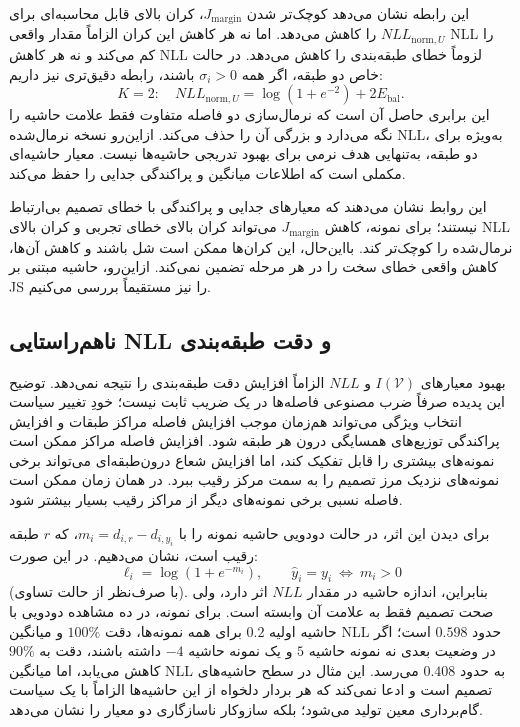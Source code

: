 این رابطه نشان می‌دهد کوچک‌تر شدن $J_{\mathrm{margin}}$، کران بالای قابل محاسبه‌ای برای $NLL_{\mathrm{norm},U}$ را کاهش می‌دهد. اما نه هر کاهش این کران الزاماً مقدار واقعی NLL را کم می‌کند و نه هر کاهش NLL لزوماً خطای طبقه‌بندی را کاهش می‌دهد. در حالت خاص دو طبقه، اگر همه $\sigma_i>0$ باشند، رابطه دقیق‌تری نیز داریم:
\begin{equation}\label{cmp:eq:ch3-normalized-NLL-binary}
\boxed{
K=2:\quad
NLL_{\mathrm{norm},U}
=\log(1+e^{-2})+2E_{\mathrm{bal}}.
}
\end{equation}
این برابری حاصل آن است که نرمال‌سازی دو فاصله متفاوت فقط علامت حاشیه را نگه می‌دارد و بزرگی آن را حذف می‌کند. ازاین‌رو نسخه نرمال‌شده NLL، به‌ویژه برای دو طبقه، به‌تنهایی هدف نرمی برای بهبود تدریجی حاشیه‌ها نیست. معیار حاشیه‌ای مکملی است که اطلاعات میانگین و پراکندگی جدایی را حفظ می‌کند.

این روابط نشان می‌دهند که معیارهای جدایی و پراکندگی
با خطای تصمیم بی‌ارتباط نیستند؛ برای نمونه،
کاهش $J_{\mathrm{margin}}$ می‌تواند کران بالای
خطای تجربی و کران بالای NLL نرمال‌شده را
کوچک‌تر کند. بااین‌حال، این کران‌ها ممکن است
شل باشند و کاهش آن‌ها، کاهش واقعی خطای سخت را
در هر مرحله تضمین نمی‌کند. ازاین‌رو،
حاشیه مبتنی بر JS را نیز مستقیماً بررسی می‌کنیم.



\subsection{ناهم‌راستایی NLL و دقت طبقه‌بندی}

بهبود معیارهای $I(\mathcal V)$ و $NLL$ الزاماً افزایش دقت طبقه‌بندی را نتیجه نمی‌دهد. توضیح این پدیده صرفاً ضرب مصنوعی فاصله‌ها در یک ضریب ثابت نیست؛ خودِ تغییر سیاست انتخاب ویژگی می‌تواند هم‌زمان موجب افزایش فاصله مراکز طبقات و افزایش پراکندگی توزیع‌های همسایگی درون هر طبقه شود. افزایش فاصله مراکز ممکن است نمونه‌های بیشتری را قابل تفکیک کند، اما افزایش شعاع درون‌طبقه‌ای می‌تواند برخی نمونه‌های نزدیک مرز تصمیم را به سمت مرکز رقیب ببرد. در همان زمان ممکن است فاصله نسبی برخی نمونه‌های دیگر از مراکز رقیب بسیار بیشتر شود.

برای دیدن این اثر، در حالت دودویی حاشیه نمونه را با $m_i=d_{i,r}-d_{i,y_i}$، که $r$ طبقه رقیب است، نشان می‌دهیم. در این صورت:
\begin{equation}\label{cmp:eq:ch3-NLL-binary-margin-contrast}
\ell_i=\log(1+e^{-m_i}),
\qquad
\widehat y_i=y_i\ \Longleftrightarrow\ m_i>0
\end{equation}
(با صرف‌نظر از حالت تساوی). بنابراین، اندازه حاشیه در مقدار $NLL$ اثر دارد، ولی صحت تصمیم فقط به علامت آن وابسته است. برای نمونه، در ده مشاهده دودویی با حاشیه اولیه $0.2$ برای همه نمونه‌ها، دقت $100\%$ و میانگین NLL حدود $0.598$ است؛ اگر در وضعیت بعدی نه نمونه حاشیه $5$ و یک نمونه حاشیه $-4$ داشته باشند، دقت به $90\%$ کاهش می‌یابد، اما میانگین NLL به حدود $0.408$ می‌رسد. این مثال در سطح حاشیه‌های تصمیم است و ادعا نمی‌کند که هر بردار دلخواه از این حاشیه‌ها الزاماً با یک سیاست گام‌برداری معین تولید می‌شود؛ بلکه سازوکار ناسازگاری دو معیار را نشان می‌دهد.

